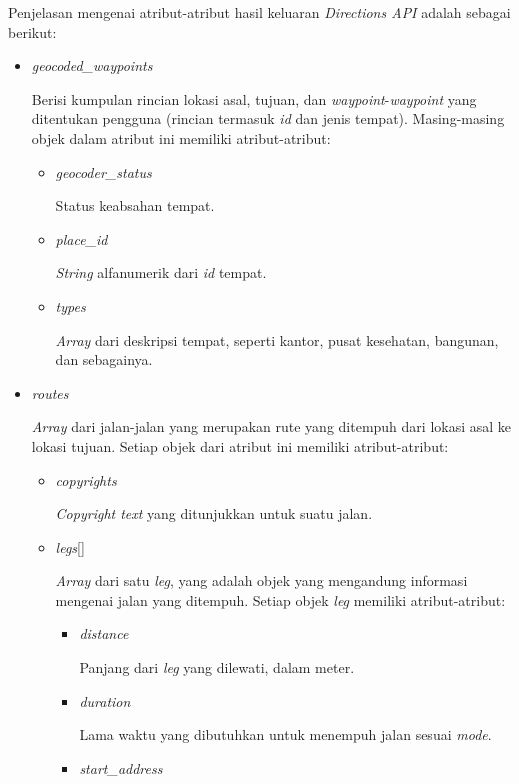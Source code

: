 Penjelasan mengenai atribut-atribut hasil keluaran \textit{Directions API} adalah sebagai berikut:

\begin{itemize}
	\item \textit{geocoded\_waypoints}
	
	Berisi kumpulan rincian lokasi asal, tujuan, dan \textit{waypoint}-\textit{waypoint} yang ditentukan pengguna (rincian termasuk \textit{id} dan jenis tempat). Masing-masing objek dalam atribut ini memiliki atribut-atribut:
	
	\begin{itemize}
		\item \textit{geocoder\_status}
		
		Status keabsahan tempat. 
		\item \textit{place\_id}
		
		\textit{String} alfanumerik dari \textit{id} tempat.
		\item \textit{types}
		
		\textit{Array} dari deskripsi tempat, seperti kantor, pusat kesehatan, bangunan, dan sebagainya. 
	\end{itemize}
	\item \textit{routes}
	
	\textit{Array} dari jalan-jalan yang merupakan rute yang ditempuh dari lokasi asal ke lokasi tujuan. Setiap objek dari atribut ini memiliki atribut-atribut:
	
	\begin{itemize}
		
		\item \textit{copyrights}
		
		\textit{Copyright text} yang ditunjukkan untuk suatu jalan.
		\item \textit{legs}[]
		
		\textit{Array} dari satu \textit{leg}, yang adalah objek yang mengandung informasi mengenai jalan yang ditempuh. Setiap objek \textit{leg} memiliki atribut-atribut:
		
		\begin{itemize}
			\item \textit{distance}
			
			Panjang dari \textit{leg} yang dilewati, dalam meter.
			\item \textit{duration}
			
			Lama waktu yang dibutuhkan untuk menempuh jalan sesuai \textit{mode}.
			\item \textit{start\_address}
			

\end{itemize}
\end{itemize}
\end{itemize}
